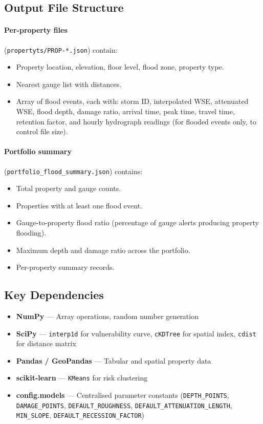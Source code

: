 \documentclass[11pt,a4paper]{article}
\begin{document}
\subsection{Output File Structure}

\paragraph{Per-property files} (\texttt{propertyts/PROP-*.json}) contain:
\begin{itemize}[nosep]
    \item Property location, elevation, floor level, flood zone, property type.
    \item Nearest gauge list with distances.
    \item Array of flood events, each with: storm ID, interpolated WSE, attenuated
          WSE, flood depth, damage ratio, arrival time, peak time, travel time,
          retention factor, and hourly hydrograph readings (for flooded events
          only, to control file size).
\end{itemize}

\paragraph{Portfolio summary} (\texttt{portfolio\_flood\_summary.json}) contains:
\begin{itemize}[nosep]
    \item Total property and gauge counts.
    \item Properties with at least one flood event.
    \item Gauge-to-property flood ratio (percentage of gauge alerts producing
          property flooding).
    \item Maximum depth and damage ratio across the portfolio.
    \item Per-property summary records.
\end{itemize}

\subsection{Key Dependencies}

\begin{itemize}[nosep]
    \item \textbf{NumPy} --- Array operations, random number generation
    \item \textbf{SciPy} --- \texttt{interp1d} for vulnerability curve,
          \texttt{cKDTree} for spatial index, \texttt{cdist} for distance matrix
    \item \textbf{Pandas / GeoPandas} --- Tabular and spatial property data
    \item \textbf{scikit-learn} --- \texttt{KMeans} for risk clustering
    \item \textbf{config.models} --- Centralised parameter constants
          (\texttt{DEPTH\_POINTS}, \texttt{DAMAGE\_POINTS}, \texttt{DEFAULT\_ROUGHNESS},
          \texttt{DEFAULT\_ATTENUATION\_LENGTH}, \texttt{MIN\_SLOPE},
          \texttt{DEFAULT\_RECESSION\_FACTOR})
\end{itemize}
\end{document}
